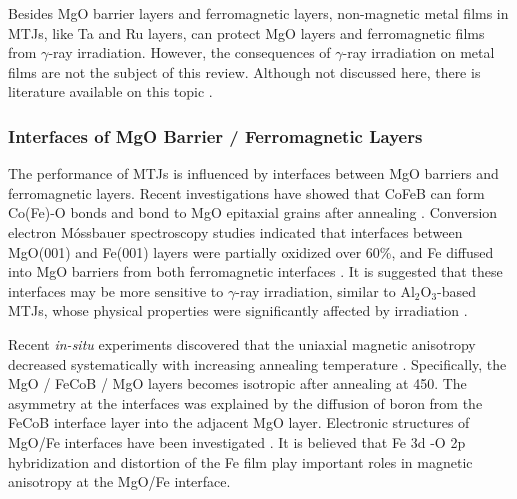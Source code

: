\documentclass[molecules,review,submit,pdftex,moreauthors]{Definitions/mdpi}
\begin{document}
Besides MgO barrier layers and ferromagnetic layers, non-magnetic metal films in MTJs, like Ta and Ru layers, can protect MgO layers and ferromagnetic films from $\gamma$-ray irradiation.  However, the consequences of $\gamma$-ray irradiation on metal films are not the subject of this review.  Although not discussed here, there is literature available on this topic \cite{Smith1972JNCS}.




\subsubsection{Interfaces of MgO Barrier / Ferromagnetic Layers}


The performance of MTJs is influenced by interfaces between MgO barriers and ferromagnetic layers.  Recent investigations have showed that CoFeB can form Co(Fe)-O bonds and bond to MgO epitaxial grains  after annealing \cite{Wang2016NL}.  Conversion electron M\'{o}ssbauer spectroscopy studies indicated that interfaces between MgO(001) and Fe(001) layers were partially oxidized over \unit{60}{\%}, and Fe diffused into MgO barriers from both ferromagnetic interfaces \cite{Mlynczak2013JAP}.  It is suggested that these interfaces may be more sensitive to $\gamma$-ray irradiation, similar to Al$_2$O$_3$-based MTJs, whose physical properties were significantly affected by irradiation \cite{Lu2015JMR}.  


Recent \textit{in-situ} experiments discovered that the uniaxial magnetic anisotropy decreased systematically with increasing annealing temperature \cite{Jamal2023PRB}.  Specifically, the MgO / FeCoB / MgO layers becomes isotropic after annealing at \unit{450}{\celsius}.  The asymmetry at the interfaces was explained by the diffusion of boron from the FeCoB interface layer into the adjacent MgO layer.  Electronic structures of MgO/Fe interfaces have been investigated \cite{Ueda2019STAM}.  It is believed that Fe 3d -O 2p hybridization and distortion of the Fe film play important roles in magnetic anisotropy at the MgO/Fe interface.
\end{document}
